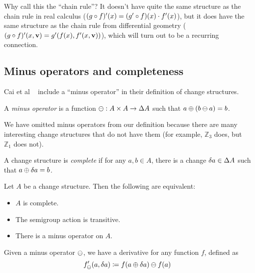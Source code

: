Why call this the ``chain rule''? It doesn't have quite the same structure as
the chain rule in real calculus ($(g \circ f)'(x) = (g' \circ f)
(x) \cdot f'(x)$), but it does have the same structure as the chain rule
from differential geometry ($(g \circ f)'(x, \textbf{v}) = g'
(f(x), f'(x, \textbf{v}))$), which will turn out to be a recurring connection.

\subsection{Minus operators and completeness}

Cai et al ~\cite{cai2014changes} include a ``minus operator'' in their definition of change structures. 

\begin{defn}
  A \textit{minus operator} is a function $\ominus: A \times A \rightarrow \Delta A$ such that $a \oplus (b \ominus a) = b$.
\end{defn}

We have omitted minus operators from our definition because
there are many interesting change structures that do not have them (for example,
$\mathbb{Z}_3$ does, but $\mathbb{Z}_1$ does not).

\begin{defn}[Completeness]
  A change structure is \textit{complete} if for any $a, b \in A$, there is
  a change $\delta a \in \Delta A$ such that $a \oplus \delta a = b$.
\end{defn}

\begin{prop}
  Let $A$ be a change structure. Then the following are equivalent:
  \begin{itemize}
    \item $A$ is complete.
    \item The semigroup action is transitive.
    \item There is a minus operator on $A$.
  \end{itemize}
\end{prop}

\begin{defn}
  Given a minus operator $\ominus$, we have a derivative for any function $f$,
  defined as
  $$f'_\ominus(a, \delta a) \coloneqq f(a \oplus \delta a) \ominus f(a)$$
\end{defn}

